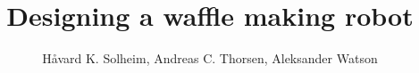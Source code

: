 \title
[Bachelor project, Mechatronics] %
{ 
Designing a waffle making robot %
}

\author{ %
Håvard K. Solheim, Andreas C. Thorsen, Aleksander Watson 
}

